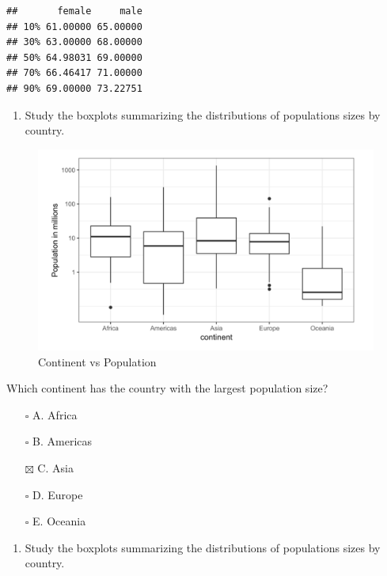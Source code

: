 \documentclass[
]{article}
\providecommand{\tightlist}{%
  \setlength{\itemsep}{0pt}\setlength{\parskip}{0pt}}
\begin{document}
\begin{verbatim}
##       female     male
## 10% 61.00000 65.00000
## 30% 63.00000 68.00000
## 50% 64.98031 69.00000
## 70% 66.46417 71.00000
## 90% 69.00000 73.22751
\end{verbatim}

\begin{enumerate}
\def\labelenumi{\arabic{enumi}.}
\setcounter{enumi}{2}
\tightlist
\item
  Study the boxplots summarizing the distributions of populations sizes
  by country.
\end{enumerate}

\begin{figure}
\centering
\includegraphics{images/Continent vs Population.png}
\caption{Continent vs Population}
\end{figure}

Which continent has the country with the largest population size?

\begin{itemize}
\tightlist
\item[$\square$]
  A. Africa
\item[$\square$]
  B. Americas
\item[$\boxtimes$]
  C. Asia
\item[$\square$]
  D. Europe
\item[$\square$]
  E. Oceania
\end{itemize}

\begin{enumerate}
\def\labelenumi{\arabic{enumi}.}
\setcounter{enumi}{3}
\tightlist
\item
  Study the boxplots summarizing the distributions of populations sizes
  by country.
\end{enumerate}
\end{document}
